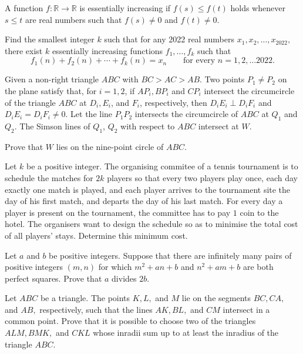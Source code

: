 \documentclass[11pt]{scrartcl}
\begin{document}
\begin{problem}[8892145789808454835]
A function $f: \mathbb{R}\to \mathbb{R}$ is essentially increasing if $f(s)\leq f(t)$ holds whenever $s\leq t$ are real numbers such that $f(s)\neq 0$ and $f(t)\neq 0$.

Find the smallest integer $k$ such that for any 2022 real numbers $x_1,x_2,\ldots , x_{2022},$ there exist $k$ essentially increasing functions $f_1,\ldots, f_k$ such that\[f_1(n) + f_2(n) + \cdots + f_k(n) = x_n\qquad \text{for every } n= 1,2,\ldots 2022.\]
\end{problem}
\begin{problem}[8895719454292056765]
Given a non-right triangle $ABC$ with $BC>AC>AB$. Two points $P_1 \neq P_2$ on the plane satisfy that, for $i=1,2$, if $AP_i, BP_i$ and $CP_i$ intersect the circumcircle of the triangle $ABC$ at $D_i, E_i$, and $F_i$, respectively, then $D_iE_i \perp D_iF_i$ and $D_iE_i = D_iF_i \neq 0$. Let the line $P_1P_2$ intersects the circumcircle of $ABC$ at $Q_1$ and $Q_2$. The Simson lines of $Q_1$, $Q_2$ with respect to $ABC$ intersect at $W$.

Prove that $W$ lies on the nine-point circle of $ABC$.
\end{problem}
\begin{problem}[8916142707013964275]
	Let $k$ be a positive integer. The organising commitee of a tennis tournament is to schedule the matches for $2k$ players so that every two players play once, each day exactly one match is played, and each player arrives to the tournament site the day of his first match, and departs the day of his last match. For every day a player is present on the tournament, the committee has to pay $1$ coin to the hotel. The organisers want to design the schedule so as to minimise the total cost of all players' stays. Determine this minimum cost.
\end{problem}
\begin{problem}[8948164820835424145]
Let $a$ and $b$ be positive integers. Suppose that there are infinitely many pairs of positive integers $(m,n)$ for which $m^2+an+b$ and $n^2+am+b$ are both perfect squares. Prove that $a$ divides $2b$.
\end{problem}
\begin{problem}[8959954456910482516]
Let $ABC$ be a triangle. The points $K, L,$ and $M$ lie on the segments $BC, CA,$ and $AB,$ respectively, such that the lines $AK, BL,$ and $CM$ intersect in a common point. Prove that it is possible to choose two of the triangles $ALM, BMK,$ and $CKL$ whose inradii sum up to at least the inradius of the triangle $ABC$.
\end{problem}
\end{document}
